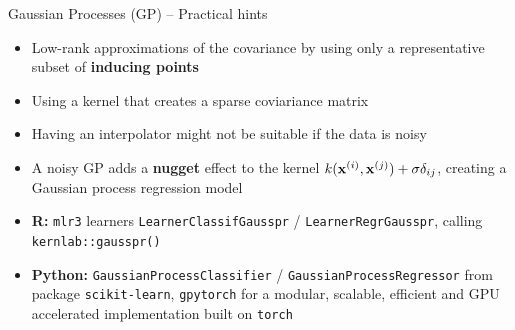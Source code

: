 \begin{frame}{Gaussian Processes (GP) -- Practical hints}

\begin{itemize}
	\item Low-rank approximations of the covariance by using only a representative subset of \textbf{inducing points}
	\item Using a kernel that creates a sparse coviariance matrix
\end{itemize}

\medskip

\begin{itemize}
    \item Having an interpolator might not be suitable if the data is noisy
    \item A noisy GP adds a \textbf{nugget} effect to the kernel $k(\mathbf{x}^{(i)}, \mathbf{x}^{(j)}) + \sigma\delta_{ij}$, creating a Gaussian process regression model
\end{itemize}

\medskip


\begin{itemize}
  \item \textbf{R:} \texttt{mlr3} learners \texttt{LearnerClassifGausspr} /
    \texttt{LearnerRegrGausspr}, calling \texttt{kernlab::gausspr()}
  \item \textbf{Python:} \texttt{GaussianProcessClassifier} /
  \texttt{GaussianProcessRegressor} from package \texttt{scikit-learn}, \texttt{gpytorch} for a modular, scalable, efficient and GPU accelerated implementation built on \texttt{torch}
\end{itemize}

\end{frame}